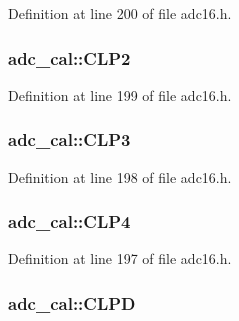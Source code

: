 Definition at line 200 of file adc16.\+h.

\subsubsection[{\texorpdfstring{C\+L\+P2}{CLP2}}]{ adc\+\_\+cal\+::\+C\+L\+P2}\hypertarget{structadc__cal_a5e734a9dd14514080b7d2d950422da70}{}\label{structadc__cal_a5e734a9dd14514080b7d2d950422da70}


Definition at line 199 of file adc16.\+h.

\subsubsection[{\texorpdfstring{C\+L\+P3}{CLP3}}]{ adc\+\_\+cal\+::\+C\+L\+P3}\hypertarget{structadc__cal_aa281ef46b94c67490ad5dab10422c05a}{}\label{structadc__cal_aa281ef46b94c67490ad5dab10422c05a}


Definition at line 198 of file adc16.\+h.

\subsubsection[{\texorpdfstring{C\+L\+P4}{CLP4}}]{ adc\+\_\+cal\+::\+C\+L\+P4}\hypertarget{structadc__cal_a9428123ce6dc17ba5d27e4694b610cc7}{}\label{structadc__cal_a9428123ce6dc17ba5d27e4694b610cc7}


Definition at line 197 of file adc16.\+h.

\subsubsection[{\texorpdfstring{C\+L\+PD}{CLPD}}]{ adc\+\_\+cal\+::\+C\+L\+PD}\hypertarget{structadc__cal_abeb274b5807cc95e90cf4457a60610f5}{}\label{structadc__cal_abeb274b5807cc95e90cf4457a60610f5}


